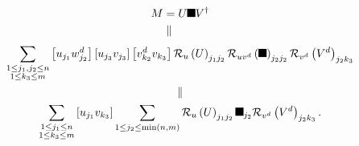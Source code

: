 \documentclass[aps,preprint]{revtex4}%
\providecommand{\U}[1]{\protect\rule{.1in}{.1in}}
\begin{document}
%

\begin{align}
M  &  =U\U{3a3} V^{\dagger}\\
&  \parallel
\end{align}%
\begin{gather*}
\sum_{\substack{1\leq j_{1},j_{2}\leq n\\1\leq k_{3}\leq m}}\left[  u_{j_{1}%
}w_{j_{2}}^{d}\right]  \left[  u_{j_{3}}v_{j_{3}}\right]  \left[  v_{k_{2}%
}^{d}v_{k_{3}}\right]  \mathcal{R}_{u}\left(  U\right)  _{j_{1}j_{2}%
}\mathcal{R}_{uv^{d}}\left(  \U{3a3} \right)  _{j_{2}j_{2}}\mathcal{R}_{v^{d}%
}\left(  V^{d}\right)  _{j_{2}k_{3}}\\
\parallel\\
\sum_{\substack{1\leq j_{1}\leq n\\1\leq k_{3}\leq m}}\left[  u_{j_{1}%
}v_{k_{3}}\right]  \sum_{1\leq j_{2}\leq\min\left(  n,m\right)  }%
\mathcal{R}_{u}\left(  U\right)  _{j_{1}j_{2}}\U{3c3} _{j_{2}}\mathcal{R}%
_{v^{d}}\left(  V^{d}\right)  _{j_{2}k_{3}}.
\end{gather*}
\end{document}
